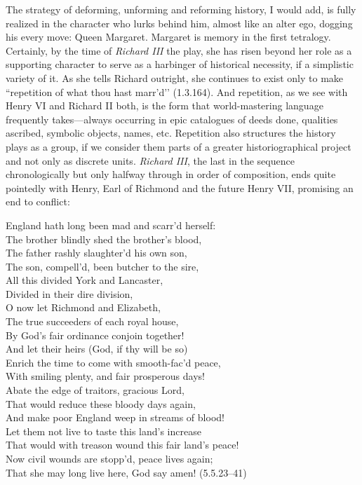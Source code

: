 The strategy of deforming, unforming and reforming history, I would add, is fully realized in the character who lurks behind him, almost like an alter ego, dogging his every move: Queen Margaret.
Margaret is memory in the first tetralogy.
Certainly, by the time of \emph{Richard III} the play, she has risen beyond her role as a supporting character to serve as a harbinger of historical necessity, if a simplistic variety of it.
As she tells Richard outright, she continues to exist only to make ``repetition of what thou hast marr’d’’ (1.3.164).
And repetition, as we see with Henry VI and Richard II both, is the form that world-mastering language frequently takes---always occurring in epic catalogues of deeds done, qualities ascribed, symbolic objects, names, etc.
Repetition also structures the history plays as a group, if we consider them parts of a greater historiographical project and not only as discrete units.
\emph{Richard III}, the last in the sequence chronologically but only halfway through in order of composition, ends quite pointedly with Henry, Earl of Richmond and the future Henry VII, promising an end to conflict:
\begin{vq}
England hath long been mad and scarr’d herself: \\
The brother blindly shed the brother’s blood, \\
The father rashly slaughter’d his own son, \\
The son, compell’d, been butcher to the sire, \\
All this divided York and Lancaster, \\
Divided in their dire division, \\
O now let Richmond and Elizabeth, \\
The true succeeders of each royal house, \\
By God’s fair ordinance conjoin together! \\
And let their heirs (God, if thy will be so) \\
Enrich the time to come with smooth-fac’d peace, \\
With smiling plenty, and fair prosperous days! \\
Abate the edge of traitors, gracious Lord, \\
That would reduce these bloody days again, \\
And make poor England weep in streams of blood! \\
Let them not live to taste this land’s increase \\
That would with treason wound this fair land’s peace! \\
Now civil wounds are stopp’d, peace lives again; \\
That she may long live here, God say amen! (5.5.23--41)
\end{vq}

